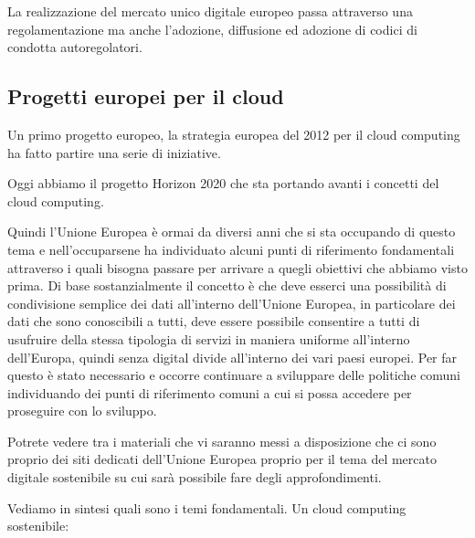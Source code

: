 La realizzazione del mercato unico digitale europeo passa attraverso una regolamentazione ma anche l'adozione, diffusione ed adozione di codici di condotta autoregolatori. 

\subsection{Progetti europei per il cloud}
Un primo progetto europeo, la strategia europea del 2012 per il cloud computing ha fatto partire una serie di iniziative. 

Oggi abbiamo il progetto Horizon 2020 che sta portando avanti i concetti del cloud computing. 

Quindi l'Unione Europea è ormai da diversi anni che si sta occupando di questo tema e nell'occuparsene ha individuato alcuni punti di riferimento fondamentali attraverso i quali bisogna passare per arrivare a quegli obiettivi che abbiamo visto prima. Di base sostanzialmente il concetto è che deve esserci una possibilità di condivisione semplice dei dati all'interno dell'Unione Europea, in particolare dei dati che sono conoscibili a tutti, deve essere possibile consentire a tutti di usufruire della stessa tipologia di servizi in maniera uniforme all'interno dell'Europa, quindi senza digital divide all'interno dei vari paesi europei. Per far questo è stato necessario e occorre continuare a sviluppare delle politiche comuni individuando dei punti di riferimento comuni a cui si possa accedere per proseguire con lo sviluppo. 

Potrete vedere tra i materiali che vi saranno messi a disposizione che ci sono proprio dei siti dedicati dell'Unione Europea proprio per il tema del mercato digitale sostenibile su cui sarà possibile fare degli approfondimenti. 

Vediamo in sintesi quali sono i temi fondamentali. Un cloud computing sostenibile:


